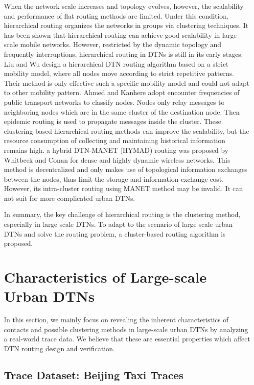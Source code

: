 \documentclass[conference]{IEEEtran}
\begin{document}
When the network scale increases and topology evolves, however, the scalability and performance of flat routing methods are limited.
Under this condition, hierarchical routing organizes the networks in groups via clustering techniques. It has been shown that hierarchical routing can achieve good scalability in large-scale mobile networks. However, restricted by the dynamic topology and frequently interruptions, hierarchical routing in DTNs is still in its early stages. Liu and Wu \cite{lLiuWu-1103} design a hierarchical DTN routing algorithm based on a strict mobility model, where all nodes move according to strict repetitive patterns. Their method is only effective such a specific mobility model and could not adapt to other mobility pattern. Ahmed and Kanhere \cite{mAhmedKanhere-14} adopt encounter frequencies of public transport networks to classify nodes. Nodes only relay messages to neighboring nodes which are in the same cluster of the destination node. Then epidemic routing is used to propagate messages inside the cluster.
These clustering-based hierarchical routing methods can improve the scalability, but the resource consumption of collecting and maintaining historical information remains high.
 a hybrid DTN-MANET (HYMAD) routing was proposed by Whitbeck and Conan \cite{oWhitbeckConan-16} for dense and highly dynamic wireless networks.
This method is decentralized and only makes use of topological information exchanges between the nodes, thus limit the storage and information exchange cost. However,  its intra-cluster routing using MANET method may be invalid. It can not suit for more complicated urban DTNs.

In summary, the key challenge of hierarchical routing is the clustering method, especially in large scale DTNs. To adapt to the scenario of large scale urban DTNs and solve the routing problem, a cluster-based routing algorithm is proposed.

\section{Characteristics of Large-scale Urban DTNs}
\label{Section3_characteristics}

In this section, we mainly focus on revealing the inherent characteristics of contacts and possible clustering methods in large-scale urban DTNs by analyzing a real-world trace data. We believe that these are essential properties which affect DTN routing design and verification.


\subsection{Trace Dataset: Beijing Taxi Traces}
\label{Trace Data}
\end{document}
